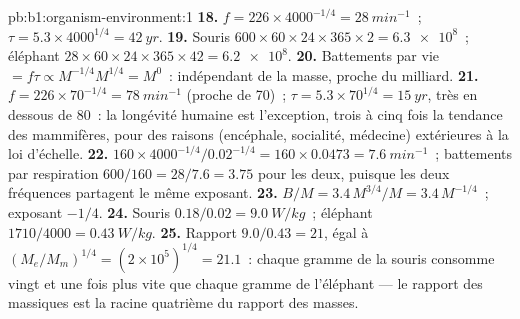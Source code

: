 \begin{solution}{pb:b1:organism-environment:1}
\textbf{18.} $f = 226\times 4000^{-1/4} = \qty{28}{min^{-1}}$~; $\tau =
5.3\times 4000^{1/4} = \qty{42}{yr}$.
\textbf{19.} Souris $600\times 60\times 24\times 365\times 2 =
\num{6.3e8}$~; éléphant $28\times 60\times 24\times 365\times 42 =
\num{6.2e8}$.
\textbf{20.} Battements par vie $= f\tau \propto M^{-1/4}M^{1/4} = M^0$~:
indépendant de la masse, proche du milliard.
\textbf{21.} $f = 226\times 70^{-1/4} = \qty{78}{min^{-1}}$ (proche de
70)~; $\tau = 5.3\times 70^{1/4} = \qty{15}{yr}$, très en dessous de 80~:
la longévité humaine est l'exception, trois à cinq fois la tendance des
mammifères, pour des raisons (encéphale, socialité, médecine) extérieures
à la loi d'échelle.
\textbf{22.} $160\times 4000^{-1/4}/0.02^{-1/4} = 160\times 0.0473 =
\qty{7.6}{min^{-1}}$~; battements par respiration $600/160 = 28/7.6 = 3.75$
pour les deux, puisque les deux fréquences partagent le même exposant.
\textbf{23.} $B/M = 3.4\,M^{3/4}/M = 3.4\,M^{-1/4}$~; exposant $-1/4$.
\textbf{24.} Souris $0.18/0.02 = \qty{9.0}{W/kg}$~; éléphant $1710/4000 =
\qty{0.43}{W/kg}$.
\textbf{25.} Rapport $9.0/0.43 = 21$, égal à $(M_e/M_m)^{1/4} =
(2\times 10^5)^{1/4} = 21.1$~: chaque gramme de la souris consomme vingt
et une fois plus vite que chaque gramme de l'éléphant --- le rapport des
 massiques est la racine quatrième du rapport des
masses.
\end{solution}
